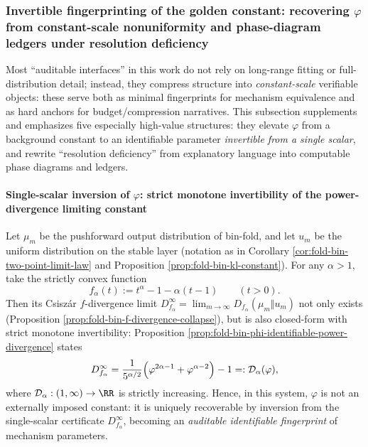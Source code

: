 ﻿%

\subsubsection{Invertible fingerprinting of the golden constant: recovering \texorpdfstring{$\varphi$}{phi} from constant-scale nonuniformity and phase-diagram ledgers under resolution deficiency}\label{subsubsec:discussion-phi-inversion-phase-ledger}
Most ``auditable interfaces'' in this work do not rely on long-range fitting or full-distribution detail; instead, they compress structure into \emph{constant-scale} verifiable objects: these serve both as minimal fingerprints for mechanism equivalence and as hard anchors for budget/compression narratives.
This subsection supplements and emphasizes five especially high-value structures: they elevate \(\varphi\) from a background constant to an identifiable parameter \emph{invertible from a single scalar}, and rewrite ``resolution deficiency'' from explanatory language into computable phase diagrams and ledgers.

\paragraph{Single-scalar inversion of \texorpdfstring{$\varphi$}{phi}: strict monotone invertibility of the power-divergence limiting constant}
Let \(\mu_m\) be the pushforward output distribution of bin-fold, and let \(u_m\) be the uniform distribution on the stable layer (notation as in Corollary \ref{cor:fold-bin-two-point-limit-law} and Proposition \ref{prop:fold-bin-kl-constant}).
For any \(\alpha>1\), take the strictly convex function
\[
f_\alpha(t):=t^\alpha-1-\alpha(t-1)\qquad(t>0).
\]
Then its Csisz\'ar \(f\)-divergence limit
\(
D_{f_\alpha}^\infty=\lim_{m\to\infty}D_{f_\alpha}(\mu_m\Vert u_m)
\)
not only exists (Proposition \ref{prop:fold-bin-f-divergence-collapse}), but is also closed-form with strict monotone invertibility: Proposition \ref{prop:fold-bin-phi-identifiable-power-divergence} states
\[
D_{f_\alpha}^\infty
=\frac{1}{5^{\alpha/2}}\Bigl(\varphi^{2\alpha-1}+\varphi^{\alpha-2}\Bigr)-1
=:\mathcal{D}_\alpha(\varphi),
\]
where \(\mathcal{D}_\alpha:(1,\infty)\to\RR\) is strictly increasing.
Hence, in this system, \(\varphi\) is not an externally imposed constant: it is uniquely recoverable by inversion from the single-scalar certificate \(D_{f_\alpha}^\infty\), becoming an \emph{auditable identifiable fingerprint} of mechanism parameters.

